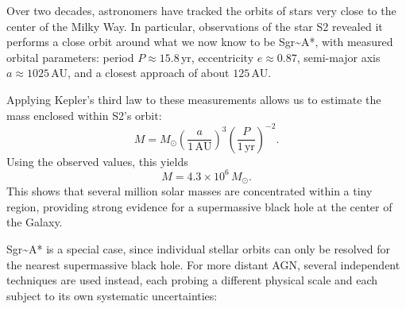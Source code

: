 \begin{exampleblock}
Over two decades, astronomers have tracked the orbits of stars very close to the center of the Milky Way. In particular, observations of the star S2 revealed it performs a close orbit around what we now know to be Sgr\textasciitilde{}A*, with measured orbital parameters: period $P \approx 15.8$\,yr, eccentricity $e \approx 0.87$, semi-major axis $a \approx 1025$\,AU, and a closest approach of about $125$\,AU.

\smallskip

Applying Kepler's third law to these measurements allows us to estimate the mass enclosed within S2's orbit:
$$
M = M_\odot \left(\frac{a}{1\,\text{AU}}\right)^3 \left(\frac{P}{1\,\text{yr}}\right)^{-2}.
$$
Using the observed values, this yields
$$
M = 4.3\times10^6\,M_\odot.
$$
This shows that several million solar masses are concentrated within a tiny region, providing strong evidence for a supermassive black hole at the center of the Galaxy.
\end{exampleblock}

\medskip

Sgr\textasciitilde{}A* is a special case, since individual stellar orbits can only be resolved for the nearest supermassive black hole. For more distant AGN, several independent techniques are used instead, each probing a different physical scale and each subject to its own systematic uncertainties: 

